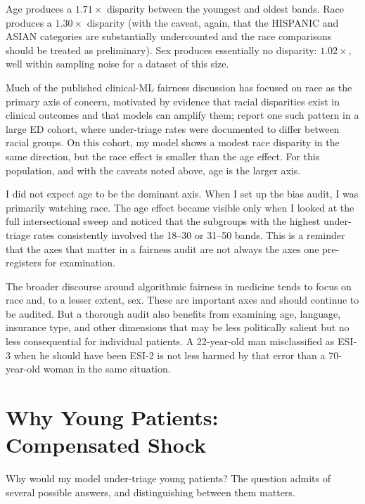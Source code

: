 Age produces a $1.71\times$ disparity between the youngest and oldest bands. Race produces a $1.30\times$ disparity (with the caveat, again, that the HISPANIC and ASIAN categories are substantially undercounted and the race comparisons should be treated as preliminary). Sex produces essentially no disparity: $1.02\times$, well within sampling noise for a dataset of this size.

Much of the published clinical-ML fairness discussion has focused on race as the primary axis of concern, motivated by evidence that racial disparities exist in clinical outcomes and that models can amplify them; \citet{sax2023mistriage} report one such pattern in a large ED cohort, where under-triage rates were documented to differ between racial groups. On this cohort, my model shows a modest race disparity in the same direction, but the race effect is smaller than the age effect. For this population, and with the caveats noted above, age is the larger axis.

\begin{remarkbox}
I did not expect age to be the dominant axis. When I set up the bias audit, I was primarily watching race. The age effect became visible only when I looked at the full intersectional sweep and noticed that the subgroups with the highest under-triage rates consistently involved the 18--30 or 31--50 bands. This is a reminder that the axes that matter in a fairness audit are not always the axes one pre-registers for examination.

The broader discourse around algorithmic fairness in medicine tends to focus on race and, to a lesser extent, sex. These are important axes and should continue to be audited. But a thorough audit also benefits from examining age, language, insurance type, and other dimensions that may be less politically salient but no less consequential for individual patients. A 22-year-old man misclassified as ESI-3 when he should have been ESI-2 is not less harmed by that error than a 70-year-old woman in the same situation.
\end{remarkbox}

\section{Why Young Patients: Compensated Shock}

Why would my model under-triage young patients? The question admits of several possible answers, and distinguishing between them matters.

